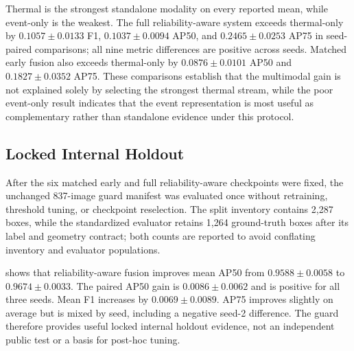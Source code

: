 Thermal is the strongest standalone modality on every reported mean, while event-only is the weakest. The full reliability-aware system exceeds thermal-only by $0.1057\pm0.0133$ F1, $0.1037\pm0.0094$ AP50, and $0.2465\pm0.0253$ AP75 in seed-paired comparisons; all nine metric differences are positive across seeds. Matched early fusion also exceeds thermal-only by $0.0876\pm0.0101$ AP50 and $0.1827\pm0.0352$ AP75. These comparisons establish that the multimodal gain is not explained solely by selecting the strongest thermal stream, while the poor event-only result indicates that the event representation is most useful as complementary rather than standalone evidence under this protocol.

\subsection{Locked Internal Holdout}
After the six matched early and full reliability-aware checkpoints were fixed, the unchanged 837-image guard manifest was evaluated once without retraining, threshold tuning, or checkpoint reselection. The split inventory contains 2,287 boxes, while the standardized evaluator retains 1,264 ground-truth boxes after its label and geometry contract; both counts are reported to avoid conflating inventory and evaluator populations.

 shows that reliability-aware fusion improves mean AP50 from $0.9588\pm0.0058$ to $0.9674\pm0.0033$. The paired AP50 gain is $0.0086\pm0.0062$ and is positive for all three seeds. Mean F1 increases by $0.0069\pm0.0089$. AP75 improves slightly on average but is mixed by seed, including a negative seed-2 difference. The guard therefore provides useful locked internal holdout evidence, not an independent public test or a basis for post-hoc tuning.
